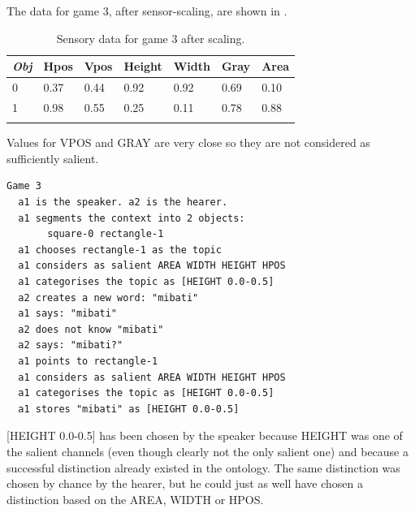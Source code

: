 The data for game 3, after sensor-scaling,
are shown in . 
\begin{table}
\begin{center}
\begin{tabular}{ l  l  l  l  l  l  l }
\lsptoprule
{\it Obj} & Hpos & Vpos & Height & Width & Gray & Area \\ \midrule
0 & 0.37 & 0.44 & 0.92 & 0.92 & 0.69 & 0.10\\ \midrule
1 & 0.98 & 0.55 & 0.25 & 0.11 & 0.78 & 0.88\\ \midrule
\lspbottomrule
\end{tabular}
\caption{\label{tab:game3} Sensory data for game 3 after scaling.}
\end{center}
\end{table}
Values for VPOS and GRAY are very close so they are not 
considered as sufficiently salient.
\begin{verbatim}
Game 3
  a1 is the speaker. a2 is the hearer. 
  a1 segments the context into 2 objects: 
       square-0 rectangle-1 
  a1 chooses rectangle-1 as the topic 
  a1 considers as salient AREA WIDTH HEIGHT HPOS 
  a1 categorises the topic as [HEIGHT 0.0-0.5]
  a2 creates a new word: "mibati"
  a1 says: "mibati"
  a2 does not know "mibati"
  a2 says: "mibati?"
  a1 points to rectangle-1
  a1 considers as salient AREA WIDTH HEIGHT HPOS 
  a1 categorises the topic as [HEIGHT 0.0-0.5]
  a1 stores "mibati" as [HEIGHT 0.0-0.5]
\end{verbatim}
[HEIGHT 0.0-0.5] has been chosen by the speaker
because HEIGHT was one of the salient channels (even 
though clearly not the only salient one) and 
because a successful distinction already existed in 
the ontology. The same 
distinction was chosen by chance by the hearer, but he 
could just as well have chosen a distinction based on 
the AREA, WIDTH or HPOS. 

